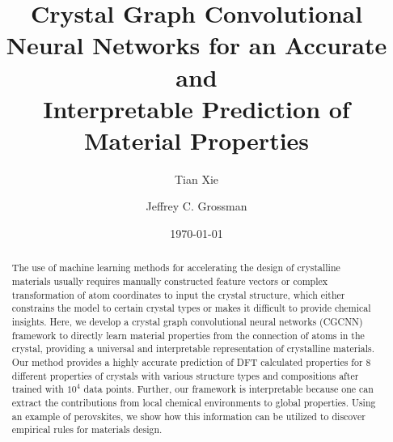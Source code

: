 \documentclass[twocolumn, prl]{revtex4-1}
\begin{document}

\title{Crystal Graph Convolutional Neural Networks for an Accurate and\\
Interpretable Prediction of Material Properties}


\author{Tian Xie}
\author{Jeffrey C. Grossman}


\date{\today}

\begin{abstract}
The use of machine learning methods for accelerating the design of crystalline materials usually requires manually constructed feature vectors or complex transformation of atom coordinates to input the crystal structure, which either constrains the model to certain crystal types or makes it difficult to provide chemical insights. Here, we develop a crystal graph convolutional neural networks (CGCNN) framework to directly learn material properties from the connection of atoms in the crystal, providing a universal and interpretable representation of crystalline materials. Our method provides a highly accurate prediction of DFT calculated properties for 8 different properties of crystals with various structure types and compositions after trained with $10^4$ data points. Further, our framework is interpretable because one can extract the contributions from local chemical environments to global properties. Using an example of perovskites, we show how this information can be utilized to discover empirical rules for materials design. 
\end{abstract}
\end{document}
